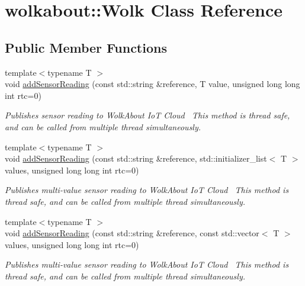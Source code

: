 \hypertarget{classwolkabout_1_1Wolk}{}\section{wolkabout\+:\+:Wolk Class Reference}
\label{classwolkabout_1_1Wolk}
\subsection*{Public Member Functions}
\begin{DoxyCompactItemize}
\item 
{\footnotesize template$<$typename T $>$ }\\void \hyperlink{classwolkabout_1_1Wolk_a8b0e5e82c95c206361bc555091581721}{add\+Sensor\+Reading} (const std\+::string \&reference, T value, unsigned long long int rtc=0)
\begin{DoxyCompactList}\small\item\em Publishes sensor reading to Wolk\+About IoT Cloud~\newline
 This method is thread safe, and can be called from multiple thread simultaneously. \end{DoxyCompactList}\item 
{\footnotesize template$<$typename T $>$ }\\void \hyperlink{classwolkabout_1_1Wolk_a107e97d09b14a9ec270834b084aa57c0}{add\+Sensor\+Reading} (const std\+::string \&reference, std\+::initializer\+\_\+list$<$ T $>$ values, unsigned long long int rtc=0)
\begin{DoxyCompactList}\small\item\em Publishes multi-\/value sensor reading to Wolk\+About IoT Cloud~\newline
 This method is thread safe, and can be called from multiple thread simultaneously. \end{DoxyCompactList}\item 
{\footnotesize template$<$typename T $>$ }\\void \hyperlink{classwolkabout_1_1Wolk_a312f30b081b6d4a8f1bb7e2215de0e5d}{add\+Sensor\+Reading} (const std\+::string \&reference, const std\+::vector$<$ T $>$ values, unsigned long long int rtc=0)
\begin{DoxyCompactList}\small\item\em Publishes multi-\/value sensor reading to Wolk\+About IoT Cloud~\newline
 This method is thread safe, and can be called from multiple thread simultaneously. \end{DoxyCompactList}\item 

\end{DoxyCompactItemize}
